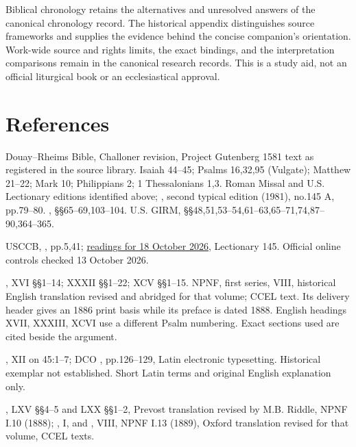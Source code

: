 Biblical chronology retains the alternatives and unresolved answers of the canonical chronology record. The historical appendix distinguishes source frameworks and supplies the evidence behind the concise companion's orientation. Work-wide source and rights limits, the exact bindings, and the interpretation comparisons remain in the canonical research records. This is a study aid, not an official liturgical book or an ecclesiastical approval.

\section{References}
\begin{description}[style=nextline,leftmargin=0pt,labelsep=0pt,itemsep=.35em]
\item[Scripture and liturgical books]
Douay--Rheims Bible, Challoner revision, Project Gutenberg 1581 text as registered in the source library. Isaiah 44--45; Psalms 16,32,95 (Vulgate); Matthew 21--22; Mark 10; Philippians 2; 1 Thessalonians 1,3. Roman Missal and U.S. Lectionary editions identified above; , second typical edition (1981), no.145 A, pp.79--80. , §§65--69,103--104. U.S. GIRM, §§48,51,53--54,61--63,65--71,74,87--90,364--365.
\item[Dated U.S. occurrence]
USCCB, , pp.5,41; \href{https://bible.usccb.org/bible/readings/101826.cfm}{readings for 18 October 2026}, Lectionary 145. Official online controls checked 13 October 2026.
\item[Augustine]
, XVI §§1--14; XXXII §§1--22; XCV §§1--15. NPNF, first series, VIII, historical English translation revised and abridged for that volume; CCEL text. Its delivery header gives an 1886 print basis while its preface is dated 1888. English headings XVII, XXXIII, XCVI use a different Psalm numbering. Exact sections used are cited beside the argument.
\item[Jerome]
, XII on 45:1--7; DCO , pp.126--129, Latin electronic typesetting. Historical exemplar not established. Short Latin terms and original English explanation only.
\item[John Chrysostom]
, LXV §§4--5 and LXX §§1--2, Prevost translation revised by M.B. Riddle, NPNF I.10 (1888); , I, and , VIII, NPNF I.13 (1889), Oxford translation revised for that volume, CCEL texts.

\end{description}
